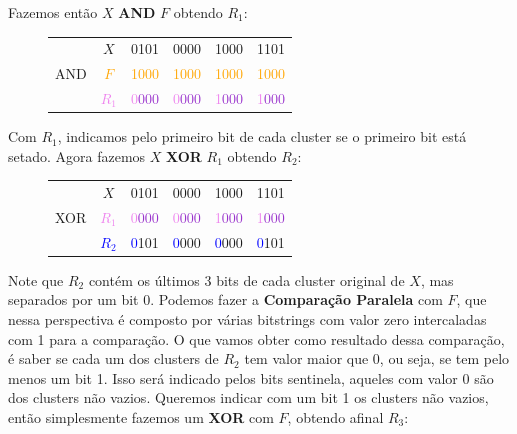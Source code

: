 Fazemos então $X$ \textbf{AND} $F$ obtendo $R_1$:

\begin{figure}[h]
 \bf \Large\centering
 \begin{tabular}{cccccc}
& \textcolor{PineGreen}{$X$} &
\textcolor{PineGreen}{0101} &
\textcolor{PineGreen}{0000} &
\textcolor{PineGreen}{1000} &
\textcolor{PineGreen}{1101} \\
AND & \textcolor{orange}{$F$} &
\textcolor{orange}{1000} &
\textcolor{orange}{1000} &
\textcolor{orange}{1000} &
\textcolor{orange}{1000} \\
      \hline
& \textcolor{Violet}{$R_1$} &
\textcolor{Violet}{0}\textcolor{DarkOrchid}{000} &
\textcolor{Violet}{0}\textcolor{DarkOrchid}{000} &
\textcolor{Violet}{1}\textcolor{DarkOrchid}{000} &
\textcolor{Violet}{1}\textcolor{DarkOrchid}{000}
 \end{tabular}
\end{figure}

Com $R_1$, indicamos pelo primeiro bit de cada cluster se o primeiro bit está
setado. Agora fazemos $X$ \textbf{XOR} $R_1$ obtendo $R_2$: 

\begin{figure}[h]
 \bf \Large\centering
 \begin{tabular}{cccccc}
& \textcolor{PineGreen}{$X$} &
\textcolor{PineGreen}{0101} &
\textcolor{PineGreen}{0000} &
\textcolor{PineGreen}{1000} &
\textcolor{PineGreen}{1101} \\
XOR & \textcolor{Violet}{$R_1$} &
\textcolor{Violet}{0}\textcolor{DarkOrchid}{000} &
\textcolor{Violet}{0}\textcolor{DarkOrchid}{000} &
\textcolor{Violet}{1}\textcolor{DarkOrchid}{000} &
\textcolor{Violet}{1}\textcolor{DarkOrchid}{000} \\
      \hline
& \textcolor{blue}{$R_2$} &
\textcolor{blue}{0}\textcolor{PineGreen}{101} &
\textcolor{blue}{0}\textcolor{PineGreen}{000} &
\textcolor{blue}{0}\textcolor{PineGreen}{000} &
\textcolor{blue}{0}\textcolor{PineGreen}{101} 
 \end{tabular}
\end{figure}

Note que $R_2$ contém os últimos 3 bits de cada cluster original de $X$, mas
separados por um bit 0. Podemos fazer a \textbf{Comparação Paralela} com $F$,
que nessa perspectiva é composto por várias bitstrings com valor zero
intercaladas com 1 para a comparação. O que vamos obter como resultado dessa
comparação, é saber se cada um dos clusters de $R_2$ tem valor maior que 0, ou
seja, se tem pelo menos um bit 1. Isso será indicado pelos bits sentinela,
aqueles com valor 0 são dos clusters não vazios. Queremos indicar com um bit 1
os clusters não vazios, então simplesmente fazemos um \textbf{XOR} com $F$,
obtendo afinal $R_3$:

